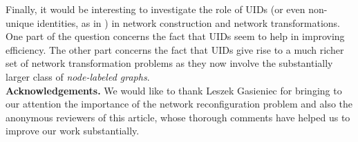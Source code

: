 \documentclass[preprint]{elsarticle}
\begin{document}
Finally, it would be interesting to investigate the role of UIDs (or even non-unique identities, as in \cite{BCR15}) in network construction and network transformations. One part of the question concerns the fact that UIDs seem to help in improving efficiency. The other part concerns the fact that UIDs give rise to a much richer set of network transformation problems as they now involve the substantially larger class of \emph{node-labeled graphs}.\\

\noindent \textbf{Acknowledgements.} We would like to thank Leszek Gasieniec for bringing to our attention the importance of the network reconfiguration problem and also the anonymous reviewers of this article, whose thorough comments have helped us to improve our work substantially.
\end{document}
